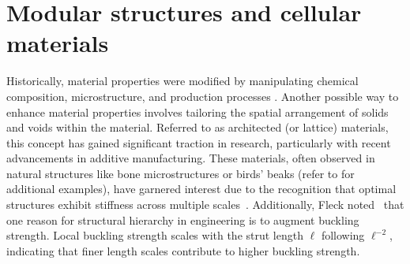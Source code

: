 \section{Modular structures and cellular materials}
Historically, material properties were modified by manipulating chemical composition, microstructure, and production processes . Another possible way to enhance material properties involves tailoring the spatial arrangement of solids and voids within the material. Referred to as architected (or lattice) materials, this concept has gained significant traction in research, particularly with recent advancements in additive manufacturing. These materials, often observed in natural structures like bone microstructures or birds' beaks (refer to  for additional examples), have garnered interest due to the recognition that optimal structures exhibit stiffness across multiple scales~. Additionally, Fleck \etal noted~ that one reason for structural hierarchy in engineering is to augment buckling strength. Local buckling strength scales with the strut length $\ell$ following $\ell^{-2}$, indicating that finer length scales contribute to higher buckling strength.
